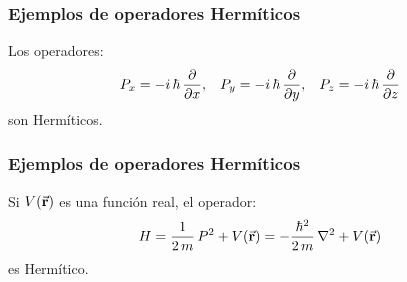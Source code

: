 \documentclass[12pt]{beamer}
\begin{document}
\begin{frame}
\frametitle{Ejemplos de operadores Hermíticos}
Los operadores:
\pause
\begin{align*}
P_{x} = -i \, \hbar \, \pdv{x}, \hspace{0.3cm} P_{y} = -i \, \hbar \, \pdv{y}, \hspace{0.3cm} P_{z} = -i \, \hbar \, \pdv{z}
\end{align*}
son Hermíticos.
\end{frame}
\begin{frame}
\frametitle{Ejemplos de operadores Hermíticos}
Si $V(\va{r})$ es una función real, el operador:
\pause
\begin{align*}
H = \dfrac{1}{2 \, m} \, P^{2} +  V(\va{r}) = - \dfrac{\hbar^{2}}{2 \, m} \, \laplacian + V(\va{r})
\end{align*}
es Hermítico.
\end{frame}
\end{document}
